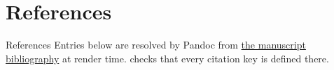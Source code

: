 \documentclass[
  ignorenonframetext,
]{beamer}
\author{\texorpdfstring{}{}}
\date{}
\begin{document}
\section{References}\label{sec:references}

\begin{frame}{References}
Entries below are resolved by Pandoc from
\href{https://github.com/ActiveInferenceInstitute/Generalized_Notation_Notation/blob/main/docs/manuscript/references.bib}{the
manuscript bibliography} at render time.
 checks that every citation
key is defined there.
\end{frame}
\end{document}
